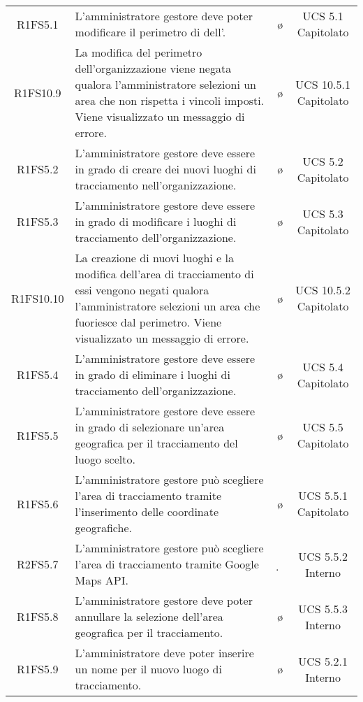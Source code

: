 {\begin{longtable}{ c C{6.5cm} c c}
R1FS5.1 & L'amministratore gestore deve poter modificare il perimetro di  dell'. & \o & UCS 5.1 Capitolato\\

R1FS10.9 & La modifica del perimetro dell'organizzazione viene negata qualora l'amministratore selezioni un area che non rispetta i vincoli imposti. Viene visualizzato un messaggio di errore. & \o & UCS 10.5.1 Capitolato \\

R1FS5.2 & L'amministratore gestore deve essere in grado di creare dei nuovi luoghi di tracciamento nell'organizzazione. & \o & UCS 5.2 Capitolato\\

R1FS5.3 & L'amministratore gestore deve essere in grado di modificare i luoghi di tracciamento dell'organizzazione. & \o & UCS 5.3 Capitolato\\

R1FS10.10 & La creazione di nuovi luoghi e la modifica dell'area di tracciamento di essi vengono negati qualora l'amministratore selezioni un area che fuoriesce dal perimetro. Viene visualizzato un messaggio di errore. & \o & UCS 10.5.2 Capitolato \\

R1FS5.4 & L'amministratore gestore deve essere in grado di eliminare i luoghi di tracciamento dell'organizzazione. & \o & UCS 5.4 Capitolato\\

R1FS5.5 & L'amministratore gestore deve essere in grado di selezionare un'area geografica per il tracciamento del luogo scelto. & \o & UCS 5.5 Capitolato\\

R1FS5.6 & L'amministratore gestore può scegliere l'area di tracciamento tramite l'inserimento delle coordinate geografiche. & \o & UCS 5.5.1 Capitolato\\

R2FS5.7 & L'amministratore gestore può scegliere l'area di tracciamento tramite Google Maps API. & \d & UCS 5.5.2 Interno\\

R1FS5.8 & L'amministratore gestore deve poter annullare la selezione dell'area geografica per il tracciamento. & \o & UCS 5.5.3 Interno\\

R1FS5.9 & L'amministratore deve poter inserire un nome per il nuovo luogo di tracciamento. & \o & UCS 5.2.1 Interno\\


\end{longtable}}
